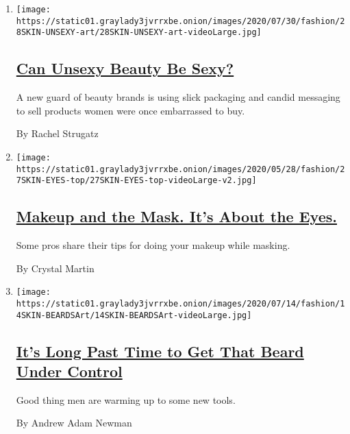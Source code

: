 \begin{enumerate}
\def\labelenumi{\arabic{enumi}.}
\item
  \texttt{[image: https://static01.graylady3jvrrxbe.onion/images/2020/07/30/fashion/28SKIN-UNSEXY-art/28SKIN-UNSEXY-art-videoLarge.jpg]}

  \hypertarget{can-unsexy-beauty-be-sexy-1}{%
  \subsection{\texorpdfstring{\href{/2020/07/28/style/can-unsexy-beauty-be-sexy.html}{Can
  Unsexy Beauty Be
  Sexy?}}{Can Unsexy Beauty Be Sexy?}}\label{can-unsexy-beauty-be-sexy-1}}

  A new guard of beauty brands is using slick packaging and candid
  messaging to sell products women were once embarrassed to buy.

  By Rachel Strugatz
\item
  \texttt{[image: https://static01.graylady3jvrrxbe.onion/images/2020/05/28/fashion/27SKIN-EYES-top/27SKIN-EYES-top-videoLarge-v2.jpg]}

  \hypertarget{makeup-and-the-mask-its-about-the-eyes}{%
  \subsection{\texorpdfstring{\href{/2020/05/26/style/makeup-and-the-mask-its-about-the-eyes.html}{Makeup
  and the Mask. It's About the
  Eyes.}}{Makeup and the Mask. It's About the Eyes.}}\label{makeup-and-the-mask-its-about-the-eyes}}

  Some pros share their tips for doing your makeup while masking.

  By Crystal Martin
\item
  \texttt{[image: https://static01.graylady3jvrrxbe.onion/images/2020/07/14/fashion/14SKIN-BEARDSArt/14SKIN-BEARDSArt-videoLarge.jpg]}

  \hypertarget{its-long-past-time-to-get-that-beard-under-control}{%
  \subsection{\texorpdfstring{\href{/2020/07/15/style/its-long-past-time-to-get-that-beard-under-control.html}{It's
  Long Past Time to Get That Beard Under
  Control}}{It's Long Past Time to Get That Beard Under Control}}\label{its-long-past-time-to-get-that-beard-under-control}}

  Good thing men are warming up to some new tools.

  By Andrew Adam Newman
\end{enumerate}

